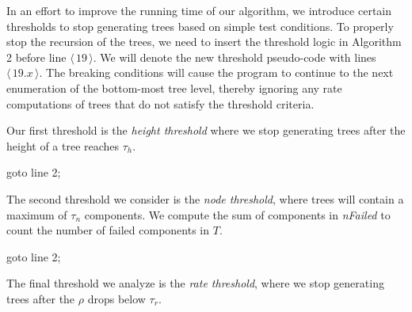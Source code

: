\documentclass[12pt]{article}
\newcommand{\varName}[1]{\textrm{\it#1}}
\newcommand{\citeLine}[1]{$\langle \, #1 \, \rangle$}
\begin{document}
\begin{minipage}[c]{\textwidth}
	\centering
	\label{fig:graph}
\end{minipage}

\vspace{1em}
In an effort to improve the running time of our algorithm, we introduce certain thresholds to stop
generating trees based on simple test conditions.  To properly stop the recursion of the trees, we need to
insert the threshold logic in Algorithm 2 before line \citeLine{19}.  We will denote the new threshold pseudo-code with
lines \citeLine{19.x}.   The breaking conditions will cause the program to continue to the next enumeration of
the bottom-most tree level, thereby ignoring any rate computations of trees that do not satisfy
the threshold criteria.

Our first threshold is the \textit{height threshold} where we stop generating trees after the height of a
tree reaches $\tau_h$. \\

\begin{algorithmic}
\IF{$\varName{depth} > \tau_h$}
 	\STATE goto line 2;
\ENDIF
\end{algorithmic}

\vspace{1em}
The second threshold we consider is the \textit{node threshold}, where trees will contain a maximum of $\tau_n$ components. We compute the sum of components in \varName{nFailed} to count the number of failed components in $T$.\\

\begin{algorithmic}
\IF{$\sum \varName{nFailed} > \tau_n$}
		\STATE goto line 2;
\ENDIF
\end{algorithmic}

\vspace{1em}
The final threshold we analyze is the \textit{rate threshold}, where we stop generating trees after the $\rho$ drops below $\tau_r$.\\
\end{document}
